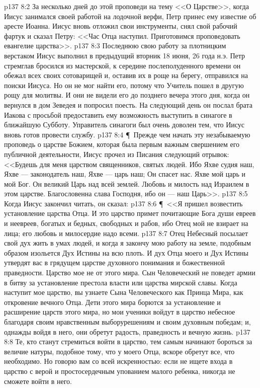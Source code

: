 \vs p137 8:2 За несколько дней до этой проповеди на тему <<О Царстве>>, когда Иисус занимался своей работой на лодочной верфи, Петр принес ему известие об аресте Иоанна. Иисус вновь отложил свои инструменты, снял свой рабочий фартук и сказал Петру: <<Час Отца наступил. Приготовимся проповедовать евангелие царства>>.
\vs p137 8:3 Последнюю свою работу за плотницким верстаком Иисус выполнил в предыдущий вторник 18 июня, 26 года н.э. Петр стремглав бросился из мастерской, к середине послеполуденного времени он обежал всех своих сотоварищей и, оставив их в роще на берегу, отправился на поиски Иисуса. Но он не мог найти его, потому что Учитель пошел в другую рощу для молитвы. И они не видели его до позднего вечера этого дня, когда он вернулся в дом Зеведея и попросил поесть. На следующий день он послал брата Иакова с просьбой предоставить ему возможность выступить в синагоге в ближайшую Субботу. Управитель синагоги был очень доволен тем, что Иисус вновь готов провести службу.
\vs p137 8:4 \P\ Прежде чем начать эту незабываемую проповедь о царстве Божием, которая была первым важным свершением его публичной деятельности, Иисус прочел из Писания следующий отрывок: <<Будешь для меня царством священников, святых людей. Ибо Яхве судия наш, Яхве --- законодатель наш, Яхве --- царь наш; Он спасет нас. Яхве мой царь и мой Бог. Он великий Царь над всей землей. Любовь и милость над Израилем в этом царстве. Благословенна слава Господня, ибо он --- наш Царь>>.
\vs p137 8:5 Когда Иисус закончил читать, он сказал:
\vs p137 8:6 \P\ <<Я пришел возвестить установление царства Отца. И это царство примет почитающие Бога души евреев и неевреев, богатых и бедных, свободных и рабов, ибо Отец мой не взирает на лица; его любовь и милосердие надо всеми.
\vs p137 8:7 Отец Небесный посылает свой дух жить в умах людей, и когда я закончу мою работу на земле, подобным образом изольется Дух Истины на всю плоть. И дух Отца моего и Дух Истины утвердят вас в грядущем царстве духовного понимания и божественной праведности. Царство мое не от этого мира. Сын Человеческий не поведет армии в битву за установление престола власти или царства мирской славы. Когда наступит мое царство, вы узнаете Сына Человеческого как Принца Мира, как откровение вечного Отца. Дети этого мира борются за установление и расширение царств этого мира, но мои ученики войдут в царство небесное благодаря своим нравственным выборурешениям и своим духовным победам; и, однажды войдя в него, они обретут радость, праведность и вечную жизнь.
\vs p137 8:8 Те, кто станут стремиться войти в царство, тем самым начинают бороться за величие натуры, подобное тому, что у моего Отца, вскоре обретут все, что необходимо. Но говорю вам со всей искренностью: если не ищете входа в царство с верой и простосердечным упованием малого ребенка, никогда не сможете войти в него.
